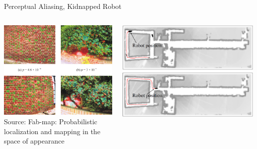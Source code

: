\begin{frame}{Perceptual Aliasing, Kidnapped Robot}
    \begin{columns}
        \begin{column}{0.5\textwidth}
            \begin{center}
                \includegraphics[width=1\textwidth]{./media/perceptual_aliasing2.png}\newline
                {\tiny Source: Fab-map: Probabilistic localization and mapping in the space of appearance~\cite{fabmap2008b}}
            \end{center}
        \end{column}
        \begin{column}{0.5\textwidth}
            \begin{center}
                \includegraphics[width=\textwidth]{./media/map1.png}\newline
                \includegraphics[width=\textwidth]{./media/map2.png}\newline

\end{center}
\end{column}
\end{columns}
\end{frame}
